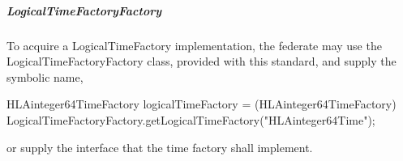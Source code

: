 \begin{compactstdpage}
    \subparagraph{LogicalTimeFactoryFactory}

    To acquire a LogicalTimeFactory implementation, the federate may use the LogicalTimeFactoryFactory class, provided with this standard, and supply the symbolic name,

        {\ttfamily\fontsize{8.3}{9.6}\selectfont
    HLAinteger64TimeFactory logicalTimeFactory = (HLAinteger64TimeFactory)\\
    LogicalTimeFactoryFactory.getLogicalTimeFactory("HLAinteger64Time");}

    or supply the interface that the time factory shall implement.

\end{compactstdpage}

\clearpage

